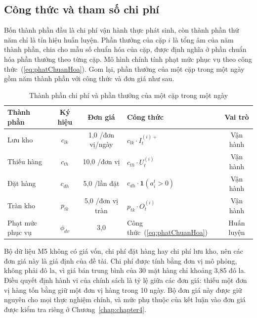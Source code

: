 \subsection{Công thức và tham số chi phí}
\label{subsec:thamSoChiPhi}

Bốn thành phần đầu là chi phí vận hành thực phát sinh, còn thành phần thứ năm chỉ là tín hiệu huấn luyện. Phần thưởng của cặp $i$ là tổng âm của năm thành phần, chia cho mẫu số chuẩn hóa của cặp, được định nghĩa ở phần chuẩn hóa phần thưởng theo từng cặp. Mô hình chính tính phạt mức phục vụ theo công thức~(\ref{eq:phatChuanHoa}). Gom lại, phần thưởng của một cặp trong một ngày gồm năm thành phần với công thức và đơn giá như sau.

\begin{table}[H]
    \centering
    \caption{Thành phần chi phí và phần thưởng của một cặp trong một ngày}
    \label{tab:thamsoChiPhi}
    \small
    \begin{tabular}{|l|c|c|l|c|}
        \hline
        Thành phần & Ký hiệu & Đơn giá & Công thức & Vai trò \\
        \hline
        Lưu kho    & $c_{lk}$    & 1,0 /đơn vị/ngày & $c_{lk} \cdot I_t^{(i)+}$ & Vận hành \\ \hline
        Thiếu hàng & $c_{th}$    & 10,0 /đơn vị     & $c_{th} \cdot U_t^{(i)}$ & Vận hành \\ \hline
        Đặt hàng   & $c_{dh}$    & 5,0 /lần đặt     & $c_{dh} \cdot \mathbf{1}(a_i^t > 0)$ & Vận hành \\ \hline
        Tràn kho   & $p_{tk}$    & 5,0 /đơn vị tràn & $p_{tk} \cdot O_t^{(i)}$ & Vận hành \\ \hline
        Phạt mức phục vụ & $\phi_{dv}$ & 3,0 & Công thức~(\ref{eq:phatChuanHoa}) & Huấn luyện \\
        \hline
    \end{tabular}
\end{table}

Bộ dữ liệu M5 không có giá vốn, chi phí đặt hàng hay chi phí lưu kho, nên các đơn giá này là giả định của đề tài. Chi phí được tính bằng đơn vị mô phỏng, không phải đô la, vì giá bán trung bình của 30 mặt hàng chỉ khoảng 3,85 đô la. Điều quyết định hành vi của chính sách là tỷ lệ giữa các đơn giá: thiếu một đơn vị hàng tốn bằng giữ một đơn vị hàng trong 10 ngày. Bộ đơn giá này được giữ nguyên cho mọi thực nghiệm chính, và mức phụ thuộc của kết luận vào đơn giá được kiểm tra riêng ở Chương~\ref{chap:chapter4}.

